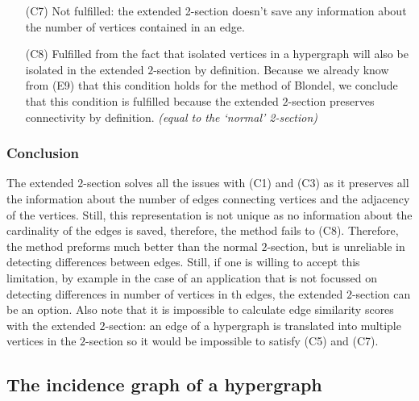 \documentclass[a4paper,11pt]{report}
\begin{document}
\begin{itemize}
\begin{proof}
 \end{proof}
 Because the $2$-section preserves structural equivalent vertices and we use the method of Blondel for which we already proved
 in (E6) that this condition holds, the result follows.
 \textit{(equal equal to the `normal' 2-section)}   
 
  \item[(C7)] Not fulfilled: the extended 2-section doesn't save any information 
  about the number of vertices contained in an edge.
    \item[(C8)] 
     Fulfilled from the fact that isolated vertices in a hypergraph will 
  also be isolated in the extended $2$-section by definition. Because we already know from (E9) that this condition
  holds for the method of Blondel, we conclude that 
  this condition is fulfilled because the extended $2$-section preserves connectivity by definition. \textit{(equal to the `normal' 2-section)}
 \end{itemize}  
\subsubsection{Conclusion}
The extended $2$-section solves all the issues with (C1) and (C3) as it preserves all the information about the number of edges connecting
vertices 
and the adjacency of the vertices. Still, this representation is not unique as no information 
about the cardinality of the edges is saved, therefore, the method fails to (C8). Therefore, the method preforms 
much
better than the normal $2$-section, but is unreliable in detecting differences between edges. 
Still, if one is willing to accept this limitation, by example in the case of an application that 
is not focussed on detecting differences in number of vertices in th edges, the extended $2$-section can be an option.
Also note that it is impossible to calculate edge similarity scores with the extended $2$-section: 
an edge of a 
hypergraph is translated into multiple vertices in the $2$-section so it would 
be impossible to satisfy (C5) and (C7). 


\subsection{The incidence graph of a hypergraph}
\end{document}
